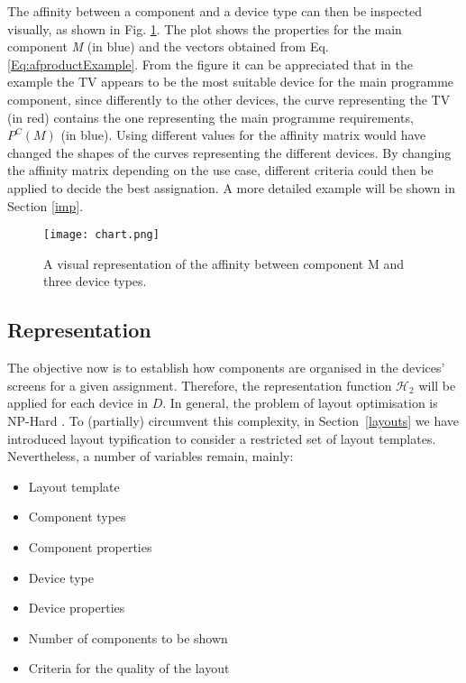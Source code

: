 The affinity between a component and a device type can then be inspected visually, as shown in Fig. \ref{fig:reqgraph}. The plot shows the properties for the main component \emph{M} (in blue) and the vectors obtained from Eq. \ref{Eq:afproductExample}. From the figure it can be appreciated that in the example the TV appears to be the most suitable device for the main programme component, since differently to the other devices, the curve representing the TV (in red) contains the one representing the main programme requirements, $P^C(M)$ (in blue).
Using different values for the affinity matrix would have changed the shapes of the curves representing the different devices. 
By changing the affinity matrix depending on the use case, different criteria could then be applied to decide the best assignation. A more detailed example will be shown in Section \ref{imp}.

\begin{figure}
	\begin{center}
		\texttt{[image: chart.png]}
		\caption{A visual representation of the affinity between component M and three device types.}
		\label{fig:reqgraph}
	\end{center}
\end{figure}

\subsection{Representation} \label{s2}

The objective now is to establish how components are organised in the devices' screens for a given assignment. 
Therefore, the representation function $\mathcal{H}_2$ will be applied for each device in $D$. 
In general, the problem of layout optimisation is NP-Hard \cite{drira2007facility} \cite{singh2006review}. 
To (partially) circumvent this complexity, in Section~\ref{layouts} we have introduced layout typification to consider a restricted set of layout templates. 
Nevertheless, a number of variables remain, mainly:
\begin{itemize}
	\item Layout template
	\item Component types
	\item Component properties
	\item Device type
	\item Device properties
	\item Number of components to be shown
	\item Criteria for the quality of the layout
\end{itemize}

